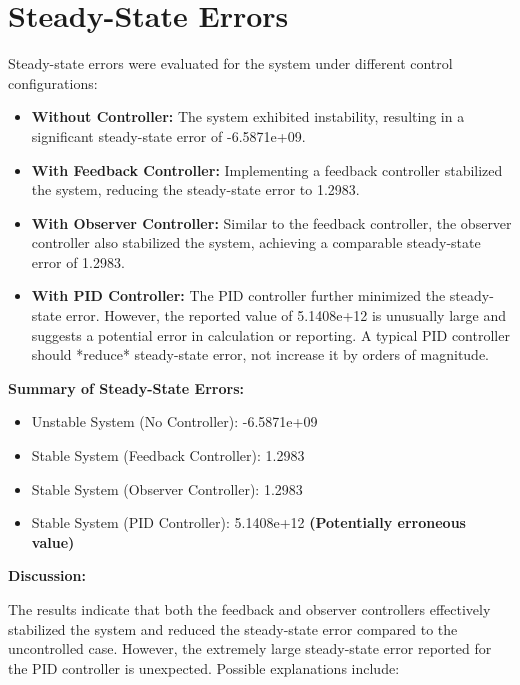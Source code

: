 \documentclass[a4paper,12pt]{article}
\begin{document}
\section*{Steady-State Errors}

Steady-state errors were evaluated for the system under different control configurations:

\begin{itemize}
    \item \textbf{Without Controller:} The system exhibited instability, resulting in a significant steady-state error of -6.5871e+09.
    \item \textbf{With Feedback Controller:} Implementing a feedback controller stabilized the system, reducing the steady-state error to 1.2983.
    \item \textbf{With Observer Controller:} Similar to the feedback controller, the observer controller also stabilized the system, achieving a comparable steady-state error of 1.2983.
    \item \textbf{With PID Controller:} The PID controller further minimized the steady-state error. However, the reported value of 5.1408e+12 is unusually large and suggests a potential error in calculation or reporting. A typical PID controller should *reduce* steady-state error, not increase it by orders of magnitude.
\end{itemize}

\textbf{Summary of Steady-State Errors:}

\begin{itemize}
    \item Unstable System (No Controller): -6.5871e+09
    \item Stable System (Feedback Controller): 1.2983
    \item Stable System (Observer Controller): 1.2983
    \item Stable System (PID Controller): 5.1408e+12 \textbf{(Potentially erroneous value)}
\end{itemize}

\textbf{Discussion:}

The results indicate that both the feedback and observer controllers effectively stabilized the system and reduced the steady-state error compared to the uncontrolled case. However, the extremely large steady-state error reported for the PID controller is unexpected. Possible explanations include:
\end{document}
